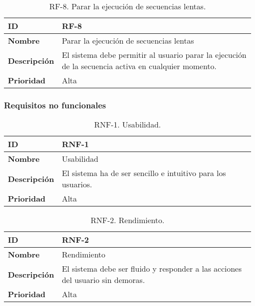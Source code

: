 \begin{table}[h!]
    \centering
    \begin{tabular}{|m{2.5cm}|m{9.27cm}|}
        \hline
        \textbf{ID} & RF-8 \\
        \hline
        \textbf{Nombre} & Parar la ejecución de secuencias lentas \\
        \hline
        \textbf{Descripción} & El sistema debe permitir al usuario parar la ejecución de la secuencia activa en cualquier momento. \\
        \hline
        \textbf{Prioridad} & Alta \\
        \hline
    \end{tabular}
    \caption{RF-8. Parar la ejecución de secuencias lentas.}
\end{table}

\FloatBarrier

\subsubsection{Requisitos no funcionales}

\begin{table}[h!]
    \centering
    \begin{tabular}{|m{2.5cm}|m{9.27cm}|}
        \hline
        \textbf{ID} & RNF-1 \\
        \hline
        \textbf{Nombre} & Usabilidad \\
        \hline
        \textbf{Descripción} & El sistema ha de ser sencillo e intuitivo para los usuarios. \\
        \hline
        \textbf{Prioridad} & Alta \\
        \hline
    \end{tabular}
    \caption{RNF-1. Usabilidad.}
    \label{tab:rnf2}
\end{table}

\begin{table}[h!]
    \centering
    \begin{tabular}{|m{2.5cm}|m{9.27cm}|}
        \hline
        \textbf{ID} & RNF-2 \\
        \hline
        \textbf{Nombre} & Rendimiento \\
        \hline
        \textbf{Descripción} & El sistema debe ser fluido y responder a las acciones del usuario sin demoras. \\
        \hline
        \textbf{Prioridad} & Alta \\
        \hline
    \end{tabular}
    \caption{RNF-2. Rendimiento.}
\end{table}

